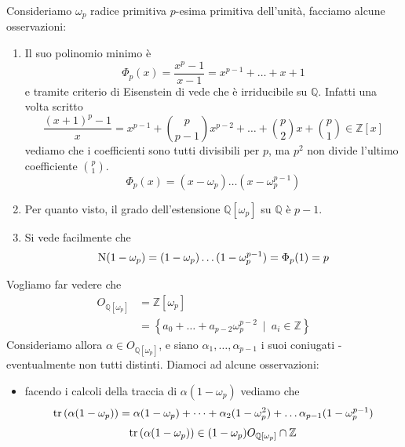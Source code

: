 \begin{esempio}
	Consideriamo $\omega_p$ radice primitiva $p$-esima primitiva dell'unità, facciamo alcune osservazioni:
	\begin{enumerate}
		\item Il suo polinomio minimo è 
		\begin{equation*}
		\Phi_p(x)=\frac{x^p-1}{x-1}=x^{p-1}+\dots+x+1
		\end{equation*}
		e tramite criterio di Eisenstein di vede che è irriducibile su $\mathbb{Q}$. Infatti una volta scritto
		\begin{equation*}
		\frac{(x+1)^p-1}{x}=x^{p-1}+\binom{p}{p-1}x^{p-2}+\dots+\binom{p}{2}x+\binom{p}{1}\in\mathbb{Z}[x]
		\end{equation*}
		vediamo che i coefficienti sono tutti divisibili per $p$, ma $p^2$ non divide l'ultimo coefficiente $\binom{p}{1}$.
		\begin{equation*}
		\Phi_p(x)=(x-\omega_p)\dots(x-\omega_p^{p-1})
		\end{equation*}
		\item Per quanto visto, il grado dell'estensione $\mathbb{Q}[\omega_p]$ su $\mathbb{Q}$ è $p-1$.
		\item Si vede facilmente che
		\begin{equation*}
		\operatorname{N}(1-\omega_p)=(1-\omega_p)\dots(1-\omega_p^{p-1})=\Phi_p(1)=p
		\end{equation*}
	\end{enumerate}
	Vogliamo far vedere che 
	\begin{align*}
	O_{\mathbb{Q}[\omega_p]}&=\mathbb{Z}[\omega_p]\\
	&=\left\{a_0+\dots+a_{p-2}\omega_p^{p-2} \ \mid \ a_i\in\mathbb{Z}\right\}
	\end{align*}
	Consideriamo allora $\alpha\in O_{\mathbb{Q}[\omega_p]}$, e siano $\alpha_1,\dots,\alpha_{p-1}$ i suoi coniugati - eventualmente non tutti distinti. Diamoci ad alcune osservazioni:
	\begin{itemize}
		\item facendo i calcoli della traccia di $\alpha(1-\omega_p)$ vediamo che 
		\begin{equation*}
		\operatorname{tr}\left(\alpha(1-\omega_p)\right)=\alpha(1-\omega_p)+\dots+\alpha_2(1-\omega_p^2)+\dots\alpha_{p-1}(1-\omega_p^{p-1})
		\end{equation*}
		\begin{equation*}
		\operatorname{tr}\left(\alpha(1-\omega_p)\right)\in(1-\omega_p)O_{\mathbb{Q}[\omega_p]}\cap\mathbb{Z}
		\end{equation*}

\end{itemize}
\end{esempio}
